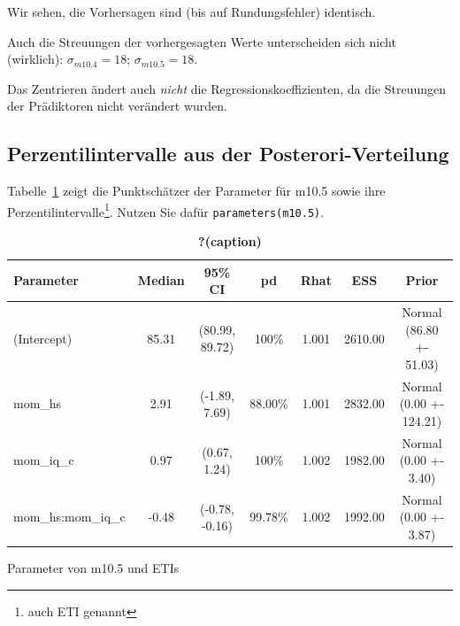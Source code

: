 \documentclass[
  a4paper,
  DIV=11]{scrreprt}
\theoremstyle{definition}
\theoremstyle{remark}
\begin{document}
Wir sehen, die Vorhersagen sind (bis auf Rundungsfehler) identisch.

Auch die Streuungen der vorhergesagten Werte unterscheiden sich nicht
(wirklich): \(\sigma_{m10.4}= 18\); \(\sigma_{m10.5}= 18\).

Das Zentrieren ändert auch \emph{nicht} die Regressionskoeffizienten, da
die Streuungen der Prädiktoren nicht verändert wurden.

\hypertarget{perzentilintervalle-aus-der-posterori-verteilung}{%
\subsection{Perzentilintervalle aus der
Posterori-Verteilung}\label{perzentilintervalle-aus-der-posterori-verteilung}}

Tabelle~\ref{tbl-m105} zeigt die Punktschätzer der Parameter für m10.5
sowie ihre Perzentilintervalle\footnote{auch ETI genannt}. Nutzen Sie
dafür \texttt{parameters(m10.5)}.

\begin{table}

\caption{\label{tbl-m105}\textbf{?(caption)}}\begin{minipage}[t]{\linewidth}

{\centering 

\begin{tabular}[t]{lcccccc}
\toprule
Parameter & Median & 95\% CI & pd & Rhat & ESS & Prior\\
\midrule
(Intercept) & 85.31 & (80.99, 89.72) & 100\% & 1.001 & 2610.00 & Normal
(86.80 +- 51.03)\\
mom\_hs & 2.91 & (-1.89, 7.69) & 88.00\% & 1.001 & 2832.00 & Normal
(0.00 +- 124.21)\\
mom\_iq\_c & 0.97 & (0.67, 1.24) & 100\% & 1.002 & 1982.00 & Normal
(0.00 +- 3.40)\\
mom\_hs:mom\_iq\_c & -0.48 & (-0.78,
-0.16) & 99.78\% & 1.002 & 1992.00 & Normal (0.00 +- 3.87)\\
\bottomrule
\end{tabular}

}

\end{minipage}%
\newline
\begin{minipage}[t]{\linewidth}

{\centering 

Parameter von m10.5 und ETIs

}

\end{minipage}%

\end{table}
\end{document}
